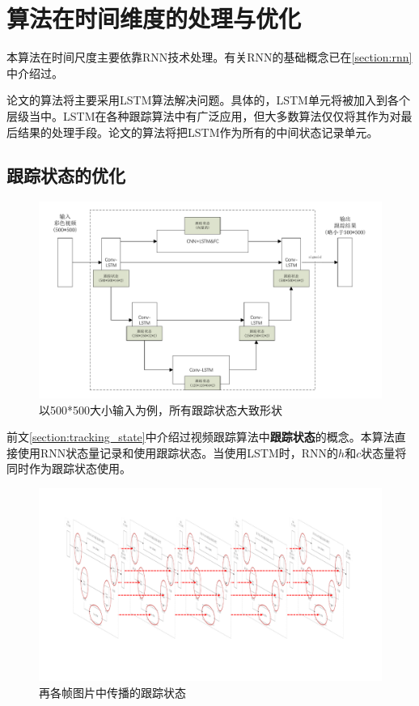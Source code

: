 \section{算法在时间维度的处理与优化}
\par
本算法在时间尺度主要依靠RNN技术处理。有关RNN的基础概念已在\ref{section:rnn}中介绍过。
\par
论文的算法将主要采用LSTM算法解决问题。具体的，LSTM单元将被加入到各个层级当中。LSTM在各种跟踪算法中有广泛应用，但大多数算法仅仅将其作为对最后结果的处理手段。论文的算法将把LSTM作为所有的中间状态记录单元。

\subsection{跟踪状态的优化}
\par
\begin{figure}
    \centering
    \includegraphics[width = 1.\textwidth]{chap/img/tracking_state.pdf}
    \caption{以500*500大小输入为例，所有跟踪状态大致形状}
    \label{fig:tracking_state}
\end{figure}
\par
前文\ref{section:tracking_state}中介绍过视频跟踪算法中\textbf{跟踪状态}的概念。本算法直接使用RNN状态量记录和使用跟踪状态。当使用LSTM时，RNN的$h$和$c$状态量将同时作为跟踪状态使用。
\par
\begin{figure}[htbp!]
    \centering
    \includegraphics[width = 1.\textwidth]{chap/img/tracking_states_3d.pdf}
    \caption{再各帧图片中传播的跟踪状态}
    \label{fig:tracking_states_3d}
\end{figure}
